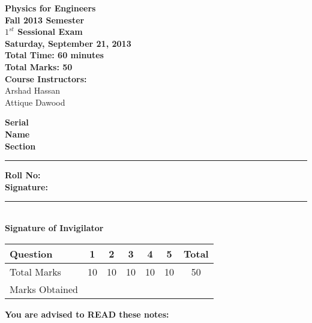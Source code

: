 \documentclass[12pt,a4paper]{article}
\def\QOne{10}
\def\Qtwo{10}
\def\Qthree{10}
\def\Qfour{10}
\def\Qfive{10}
\def\TotalMarks{50}
\begin{document}
\begin{minipage}{0.55\textwidth}
{\LARGE \textbf{Physics for Engineers}}\\[0.15cm]
{\normalsize \textbf{Fall 2013 Semester}}\\
{\Large \textbf{$1^{st}$ Sessional Exam}}\\
{\normalsize \textbf{Saturday, September 21, 2013}}\\[0.30cm]
{\Large \textbf{Total Time: 60 minutes}}\\[0.15cm]
{\Large \textbf{Total Marks: 50}}\\
\textbf{Course Instructors:}\\
Arshad Hassan\\
Attique Dawood\\
\end{minipage}
\begin{minipage}{0.4\textwidth}
\textbf{Serial} \hrulefill \\[0.25cm]
\textbf{Name} \hrulefill\\[0.25cm]
\textbf{Section} \rule{1cm}{0.2mm} \textbf{Roll No:} \hrulefill\\[0.25cm]
\textbf{Signature:} \hrulefill\\[0.25cm]
\rule{6.6cm}{0.2mm}\\
\textbf{Signature of Invigilator}\\[0.25cm]
\end{minipage}
\begin{table}[H]
\begin{center}
\vspace{0.3cm}
	{\large \begin{tabular}{|l|c|c|c|c|c|c|}
	\hline
		\rule{0pt}{2.6ex} Question & \textbf{1} & \textbf{2} & \textbf{3} & \textbf{4} & \textbf{5} & \textbf{Total}\\
		\hline
		Total Marks \rule{0pt}{2.6ex} & \QOne & \Qtwo & \Qthree & \Qfour & \Qfive & \TotalMarks\\
		\hline
		Marks Obtained \rule{0pt}{2.6ex} & & & & & &\\
	\hline
	\end{tabular}}
\end{center}
\end{table}
\noindent \textbf{You are advised to READ these notes:}
\end{document}
